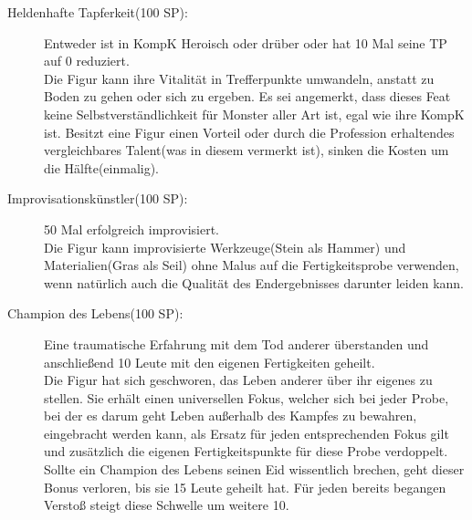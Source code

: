 \documentclass[a4paper,12pt,oneside]{book}
\begin{document}
\begin{description}
\item[Heldenhafte Tapferkeit(100 SP):] Entweder ist in KompK Heroisch oder drüber oder hat 10 Mal seine TP auf 0 reduziert.
\\Die Figur kann ihre Vitalität in Trefferpunkte umwandeln, anstatt zu Boden zu gehen oder sich zu ergeben. Es sei angemerkt, dass dieses Feat keine Selbstverständlichkeit für Monster aller Art ist, egal wie ihre KompK ist. Besitzt eine Figur einen Vorteil oder durch die Profession erhaltendes vergleichbares Talent(was in diesem vermerkt ist), sinken die Kosten um die Hälfte(einmalig).
\item[Improvisationskünstler(100 SP):] 50 Mal erfolgreich improvisiert.
\\Die Figur kann improvisierte Werkzeuge(Stein als Hammer) und Materialien(Gras als Seil) ohne Malus auf die Fertigkeitsprobe verwenden, wenn natürlich auch die Qualität des Endergebnisses darunter leiden kann.
\item[Champion des Lebens(100 SP):] Eine traumatische Erfahrung mit dem Tod anderer überstanden und anschließend 10 Leute mit den eigenen Fertigkeiten geheilt.
\\Die Figur hat sich geschworen, das Leben anderer über ihr eigenes zu stellen. Sie erhält einen universellen Fokus, welcher sich bei jeder Probe, bei der es darum geht Leben außerhalb des Kampfes zu bewahren, eingebracht werden kann, als Ersatz für jeden entsprechenden Fokus gilt und zusätzlich die eigenen Fertigkeitspunkte für diese Probe verdoppelt. Sollte ein Champion des Lebens seinen Eid wissentlich brechen, geht dieser Bonus verloren, bis sie 15 Leute geheilt hat. Für jeden bereits begangen Verstoß steigt diese Schwelle um weitere 10.
\end{description}
\end{document}
